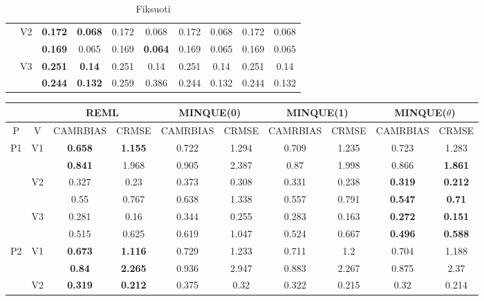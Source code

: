 \documentclass[12pt,a4paper]{article}
\begin{document}
\begin{sidewaystable}[ht]
{\begin{tabular}{cc|cc|cc|cc|cc|}
   & \multirow{2}{*}{V2} & \textbf{0.172} & \textbf{0.068} & 0.172 & 0.068 & 0.172 & 0.068 & 0.172 & 0.068 \\ 
   &  & \textbf{0.169} & 0.065 & 0.169 & \textbf{0.064} & 0.169 & 0.065 & 0.169 & 0.065 \\ 
   & \multirow{2}{*}{V3} & \textbf{0.251} & \textbf{0.14} & 0.251 & 0.14 & 0.251 & 0.14 & 0.251 & 0.14 \\ 
   &  & \textbf{0.244} & \textbf{0.132} & 0.259 & 0.386 & 0.244 & 0.132 & 0.244 & 0.132 \\ 
   \hline
\end{tabular}
}
\caption{Fiksuoti}
\end{sidewaystable}

\begin{sidewaystable}[ht]
\centering
{\footnotesize
\begin{tabular}{cc|cc|cc|cc|cc|}
   & & \multicolumn{2}{c|}{REML}&\multicolumn{2}{c|}{MINQUE(0)}&\multicolumn{2}{c|}{MINQUE(1)}&\multicolumn{2}{c|}{MINQUE($\theta$)}\\ \hline
P & V & CAMRBIAS & CRMSE & CAMRBIAS & CRMSE & CAMRBIAS & CRMSE & CAMRBIAS & CRMSE \\ 
  \hline
\multirow{6}{*}{P1} & \multirow{2}{*}{V1} & \textbf{0.658} & \textbf{1.155} & 0.722 & 1.294 & 0.709 & 1.235 & 0.723 & 1.283 \\ 
   &  & \textbf{0.841} & 1.968 & 0.905 & 2.387 & 0.87 & 1.998 & 0.866 & \textbf{1.861} \\ 
   & \multirow{2}{*}{V2} & 0.327 & 0.23 & 0.373 & 0.308 & 0.331 & 0.238 & \textbf{0.319} & \textbf{0.212} \\ 
   &  & 0.55 & 0.767 & 0.638 & 1.338 & 0.557 & 0.791 & \textbf{0.547} & \textbf{0.71} \\ 
   & \multirow{2}{*}{V3} & 0.281 & 0.16 & 0.344 & 0.255 & 0.283 & 0.163 & \textbf{0.272} & \textbf{0.151} \\ 
   &  & 0.515 & 0.625 & 0.619 & 1.047 & 0.524 & 0.667 & \textbf{0.496} & \textbf{0.588} \\ 
   \hline \hline\multirow{6}{*}{P2} & \multirow{2}{*}{V1} & \textbf{0.673} & \textbf{1.116} & 0.729 & 1.233 & 0.711 & 1.2 & 0.704 & 1.188 \\ 
   &  & \textbf{0.84} & \textbf{2.265} & 0.936 & 2.947 & 0.883 & 2.267 & 0.875 & 2.37 \\ 
   & \multirow{2}{*}{V2} & \textbf{0.319} & \textbf{0.212} & 0.375 & 0.32 & 0.322 & 0.215 & 0.32 & 0.214 \\ 

\end{tabular}}
\end{sidewaystable}
\end{document}
